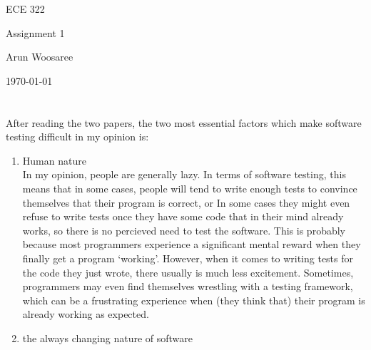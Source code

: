 \documentclass[letterpaper]{article}
\begin{document}
\begin{titlepage}
 \begin{center}
  \vspace*{1cm}
  \Huge
  ECE 322
  \vspace{1cm}
  
  Assignment 1
  \vspace{1cm}
  
  Arun Woosaree
  
  \today
  \vfill
 \end{center}
\end{titlepage}

\section{}
After reading the two papers, the two most essential factors which make software testing difficult in my opinion is: 

\begin{enumerate}
	\item Human nature\\
		In my opinion, people are generally lazy. In terms of software testing, this means that in some cases,
		people will tend to write enough tests to convince themselves that their program is correct, or 
		In some cases they might even refuse to write tests once they have some code that in their mind already works, 
		so there is no percieved need to test the software.
		This is probably because most programmers experience a significant mental reward when they finally get a program `working'.
		However, when it comes to writing tests for the code they just wrote, there usually is much less excitement.
		Sometimes, programmers may even find themselves wrestling with a testing framework, which can be a frustrating experience when (they think that)
		their program is already working as expected.

	\item the always changing nature of software

\end{enumerate}

\section{}
\end{document}
